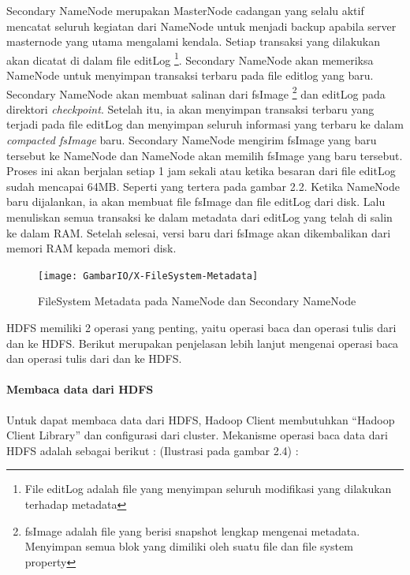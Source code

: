 \begin{enumerate}
			Secondary NameNode merupakan MasterNode cadangan yang selalu aktif mencatat seluruh kegiatan dari NameNode untuk menjadi backup apabila server masternode yang utama mengalami kendala. Setiap transaksi yang dilakukan akan dicatat di dalam file editLog \footnote{File editLog adalah file yang menyimpan seluruh modifikasi yang dilakukan terhadap metadata}. Secondary NameNode akan memeriksa NameNode untuk menyimpan transaksi terbaru pada file editlog yang baru. Secondary NameNode akan membuat salinan dari fsImage \footnote{fsImage adalah file yang berisi snapshot lengkap mengenai metadata. Menyimpan semua blok yang dimiliki oleh suatu file dan file system property} dan editLog pada direktori \textit{checkpoint}. Setelah itu, ia akan menyimpan transaksi terbaru yang terjadi pada file editLog dan menyimpan seluruh informasi yang terbaru ke dalam \textit{compacted fsImage} baru. Secondary NameNode mengirim fsImage yang baru tersebut ke NameNode dan NameNode akan memilih fsImage yang baru tersebut. Proses ini akan berjalan setiap 1 jam sekali atau ketika besaran dari file editLog sudah mencapai 64MB. 
			Seperti yang tertera pada gambar 2.2. Ketika NameNode baru dijalankan, ia akan membuat file fsImage dan file editLog dari disk. Lalu menuliskan semua transaksi ke dalam metadata dari editLog yang telah di salin ke dalam RAM. Setelah selesai, versi baru dari fsImage akan dikembalikan dari memori RAM kepada memori disk.
		\end{enumerate}		
		
			
			\begin{figure}[ht]
			\centering
			\texttt{[image: GambarIO/X-FileSystem-Metadata]}
			\caption[FileSystem Metadata pada NameNode dan Secondary NameNode]{FileSystem Metadata pada NameNode dan Secondary NameNode}
			\label{fig:FileSystem Metadata pada NameNode dan Secondary NameNode}
			\end{figure}
			
			HDFS memiliki 2 operasi yang penting, yaitu operasi baca dan operasi tulis dari dan ke HDFS. Berikut merupakan penjelasan lebih lanjut mengenai operasi baca dan operasi tulis dari dan ke HDFS.
		
		\paragraph{Membaca data dari HDFS}
			Untuk dapat membaca data dari HDFS, Hadoop Client membutuhkan "`Hadoop Client Library"' dan configurasi dari cluster. Mekanisme operasi baca data dari HDFS adalah sebagai berikut : (Ilustrasi pada gambar 2.4) : 
			

